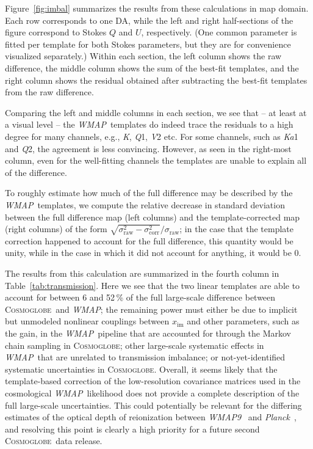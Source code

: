 \documentclass[twocolumn]{../../common/aa}
\def\WMAP{\emph{WMAP}}
\def\WMAPnine{\emph{WMAP9}}
\def\Planck{\emph{Planck}}
\newcommand{\cosmoglobe}{\textsc{Cosmoglobe}}
\newcommand{\K}[0]{\textit K}
\newcommand{\Ka}[0]{\textit{Ka}}
\newcommand{\Q}[0]{\textit Q}
\newcommand{\V}[0]{\textit V}
\begin{document}
Figure~\ref{fig:imbal} summarizes the results from these calculations in map domain. Each row corresponds to one DA, while the left and right half-sections of the figure correspond to Stokes $Q$ and $U$, respectively. (One common parameter is fitted per template for both Stokes parameters, but they are for convenience visualized separately.) Within each section, the left column shows the raw difference, the middle column shows the sum of the best-fit templates, and the right column shows the residual obtained after subtracting the best-fit templates from the raw difference.


Comparing the left and middle columns in each section, we see that -- at least at a visual level -- the \WMAP\ templates do indeed trace the residuals to a high degree for many channels, e.g., \K, \Q1, \V2 etc. For some channels, such as \Ka1 and \Q2, the agreement is less convincing. However, as seen in the right-most column, even for the well-fitting channels the templates are unable to explain all of the difference.

To roughly estimate how much of the full difference may be described by the \WMAP\ templates, we compute the relative decrease in standard deviation between the full difference map (left columns) and the template-corrected map (right columns) of the form $\sqrt{\sigma_{\mathrm{raw}}^2 - \sigma_{\mathrm{corr}}^2}/\sigma_{\mathrm{raw}}$; in the case that the template correction happened to account for the full difference, this quantity would be unity, while in the case in which it did not account for anything, it would be 0.

The results from this calculation are summarized in the fourth column in Table~\ref{tab:transmission}. Here we see that the two linear templates are able to account for between 6 and 52\,\% of the full large-scale difference between \cosmoglobe\ and \WMAP; the remaining power must either be due to implicit but unmodeled nonlinear couplings between $x_{\mathrm{im}}$ and other parameters, such as the gain, in the \WMAP\ pipeline that are accounted for through the Markov chain sampling in \cosmoglobe; other large-scale systematic effects in \WMAP\ that are unrelated to transmission imbalance; or not-yet-identified systematic uncertainties in \cosmoglobe. Overall, it seems likely that the template-based correction of the low-resolution covariance matrices used in the cosmological \WMAP\ likelihood does not provide a complete description of the full large-scale uncertainties. This could potentially be relevant for the differing estimates of the optical depth of reionization between \WMAPnine\ \citep{hinshaw2012} and \Planck\ \citep{planck2016-l05}, and resolving this point is clearly a high priority for a future second \cosmoglobe\ data release.
\end{document}

